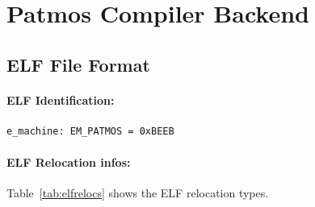 



%



\section{Patmos Compiler Backend}
\label{sec:toolchain:backend}

\subsection{ELF File Format}

\paragraph{ELF Identification:}

\begin{verbatim}
e_machine: EM_PATMOS = 0xBEEB
\end{verbatim}

\paragraph{ELF Relocation infos:}
Table~\ref{tab:elfrelocs} shows the ELF relocation types.

